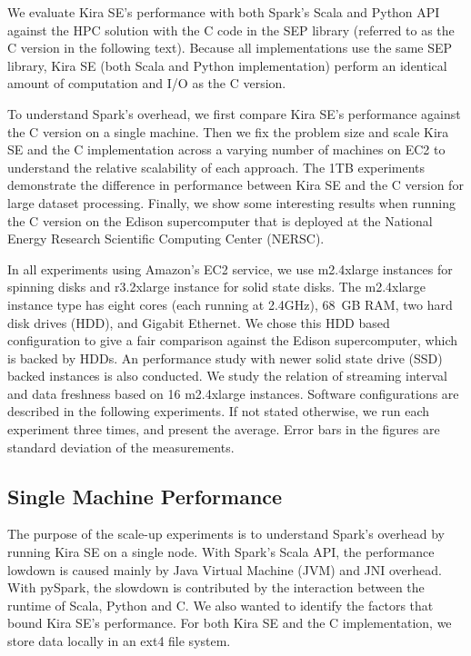 \documentclass[10pt,journal,compsoc]{IEEEtran}
\begin{document}
We evaluate Kira SE's performance with both Spark's Scala and Python API against the HPC solution with the 
C code in the SEP library (referred to as the C version in the following text). 
Because all implementations use the same SEP library, Kira SE (both Scala and Python implementation) 
perform an identical amount of computation and I/O as the C version.

To understand Spark's overhead, we first compare Kira SE's performance against the C version on a single
machine. Then we fix the problem size and scale Kira SE and the C implementation across a
varying number of machines on EC2 to understand the relative scalability of each approach.
The 1TB experiments demonstrate the difference in performance between Kira SE and the C version
for large dataset processing. Finally, we show some interesting results when running the C
version on the Edison supercomputer that is deployed at the National Energy Research Scientific Computing Center (NERSC).

In all experiments using Amazon's EC2 service, we use m2.4xlarge instances for spinning disks and r3.2xlarge instance for solid state disks.
The m2.4xlarge instance type has eight cores (each running at 2.4GHz), 68~GB RAM, two hard disk drives (HDD), and Gigabit Ethernet. 
We chose this HDD based configuration to give a fair comparison against the Edison supercomputer, which is backed by HDDs. 
An performance study with newer solid state drive (SSD) backed instances is also conducted.
We study the relation of streaming interval and data freshness based on 16 m2.4xlarge instances.
Software configurations are described in the following experiments.
If not stated otherwise, we run each experiment three times, and present the average.
Error bars in the figures are standard deviation of the measurements.

\subsection{Single Machine Performance}
\label{sec:Performance-scaleup}

The purpose of the scale-up experiments is to understand Spark's overhead by running
Kira SE on a single node. 
With Spark's Scala API, the performance lowdown is caused mainly by Java Virtual Machine (JVM) and JNI overhead.
With pySpark, the slowdown is contributed by the interaction between the runtime of Scala, Python and C. 
We also wanted to identify the factors that bound Kira SE's performance. 
For both Kira SE and the C implementation, we store data locally in an ext4 file system.
\end{document}
